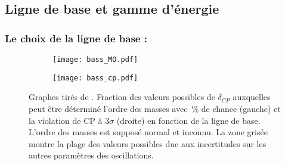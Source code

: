     \subsection{Ligne de base et gamme d'énergie}\label{sec::carac}

      \subsubsection{Le choix de la ligne de base :}
        
        \begin{figure}[htpb]
          \begin{subfigure}[t]{0.49\textwidth}
            \texttt{[image: bass\_MO.pdf]}
          \end{subfigure}\hfill
          \begin{subfigure}[t]{0.49\textwidth}
            \texttt{[image: bass\_cp.pdf]}
          \end{subfigure}
            \caption[Possibilité de déterminer l'ordre des masses et de la violation de CP en fonction de la ligne de base]{\label{fig::bass_fig}Graphes tirés de \cite{Bass2013}. Fraction des valeurs possibles de $\delta_{CP}$ auxquelles peut être déterminé l'ordre des masses avec \,\% de chance (gauche) et la violation de CP à $3\sigma$ (droite) en fonction de la ligne de base. L'ordre des masses est supposé normal et inconnu. La zone grisée montre la plage des valeurs possibles due aux incertitudes sur les autres paramètres des oscillations.}
        \end{figure}
